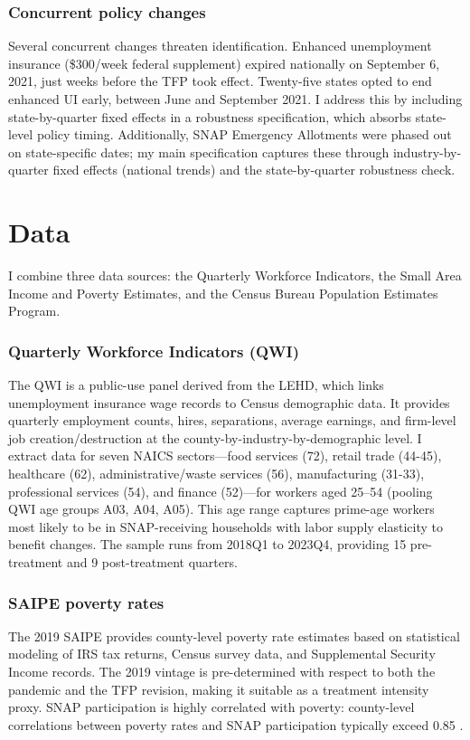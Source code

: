 \documentclass[12pt]{article}
\begin{document}
\subsubsection*{Concurrent policy changes} Several concurrent changes threaten identification. Enhanced unemployment insurance (\$300/week federal supplement) expired nationally on September 6, 2021, just weeks before the TFP took effect. Twenty-five states opted to end enhanced UI early, between June and September 2021. I address this by including state-by-quarter fixed effects in a robustness specification, which absorbs state-level policy timing. Additionally, SNAP Emergency Allotments were phased out on state-specific dates; my main specification captures these through industry-by-quarter fixed effects (national trends) and the state-by-quarter robustness check.


\section{Data}

I combine three data sources: the Quarterly Workforce Indicators, the Small Area Income and Poverty Estimates, and the Census Bureau Population Estimates Program.

\subsubsection*{Quarterly Workforce Indicators (QWI)} The QWI is a public-use panel derived from the LEHD, which links unemployment insurance wage records to Census demographic data. It provides quarterly employment counts, hires, separations, average earnings, and firm-level job creation/destruction at the county-by-industry-by-demographic level. I extract data for seven NAICS sectors---food services (72), retail trade (44-45), healthcare (62), administrative/waste services (56), manufacturing (31-33), professional services (54), and finance (52)---for workers aged 25--54 (pooling QWI age groups A03, A04, A05). This age range captures prime-age workers most likely to be in SNAP-receiving households with labor supply elasticity to benefit changes. The sample runs from 2018Q1 to 2023Q4, providing 15 pre-treatment and 9 post-treatment quarters.

\subsubsection*{SAIPE poverty rates} The 2019 SAIPE provides county-level poverty rate estimates based on statistical modeling of IRS tax returns, Census survey data, and Supplemental Security Income records. The 2019 vintage is pre-determined with respect to both the pandemic and the TFP revision, making it suitable as a treatment intensity proxy. SNAP participation is highly correlated with poverty: county-level correlations between poverty rates and SNAP participation typically exceed 0.85 \citep{ziliak2016}.
\end{document}
